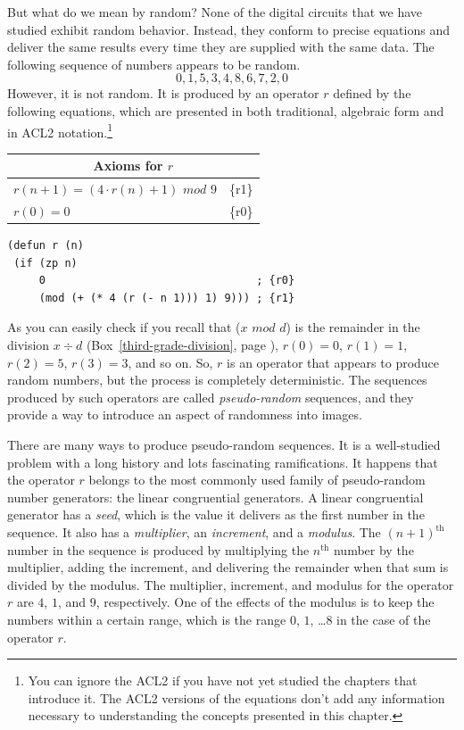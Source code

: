 But what do we mean by random?
None of the digital circuits
that we have studied exhibit random behavior.
Instead, they conform to precise equations and deliver the same
results every time they are supplied with the same data.
The following sequence of numbers appears to be random.
$$0, 1, 5, 3, 4, 8, 6, 7, 2, 0$$
However, it is not random. It is produced by an
operator $r$ defined by the following equations,
which are presented in both traditional, algebraic form
and in ACL2 notation.\footnote{You can ignore the ACL2
if you have not yet studied the chapters that introduce it.
The ACL2 versions of the equations don't add any information
necessary to understanding the concepts presented in this chapter.}
\begin{center}
\begin{tabular}{ll}
\multicolumn{2}{c}{Axioms for $r$}\\
\hline
$r(n+1) = (4\cdot r(n) + 1)$ $mod$ $9$ & \{r1\}\\
$r(0) = 0$                        & \{r0\}\\
\end{tabular}
\end{center}
\begin{code}	
\begin{verbatim}
(defun r (n)
 (if (zp n)
     0                                 ; {r0}
     (mod (+ (* 4 (r (- n 1))) 1) 9))) ; {r1}
\end{verbatim}
\end{code}

As you can easily check if you
recall that ($x$ $mod$ $d$) is the remainder in
the division $x \div d$
(Box~\ref{third-grade-division}, page \pageref{third-grade-division}),
$r(0) = 0$, $r(1) = 1$, $r(2) = 5$, $r(3) = 3$,
and so on.
So, $r$ is an operator that appears to produce random
numbers, but the process is completely deterministic.
The sequences produced by such operators
are called \emph{pseudo-random}
sequences,
and they provide a way to introduce an aspect of randomness into images.

There are many ways to produce pseudo-random sequences.
It is a well-studied problem with a long history and lots
fascinating ramifications. It happens that the operator
$r$ belongs to the most commonly used
family of pseudo-random number generators: the
linear congruential generators.
A linear congruential generator has a \emph{seed}, which is
the value it delivers as the first number in the sequence.
It also has a \emph{multiplier}, an \emph{increment}, and a \emph{modulus}.
The $(n+1)^\text{th}$ number in the sequence
is produced by multiplying the $n^\text{th}$ number by
the multiplier, adding the increment, and delivering
the remainder when that sum is divided by the modulus.
The multiplier, increment, and modulus for the operator $r$
are $4$, $1$, and $9$, respectively.
One of the effects of the modulus is to keep the numbers
within a certain range, which is the range $0$, $1$, \dots $8$ in
the case of the operator $r$.

